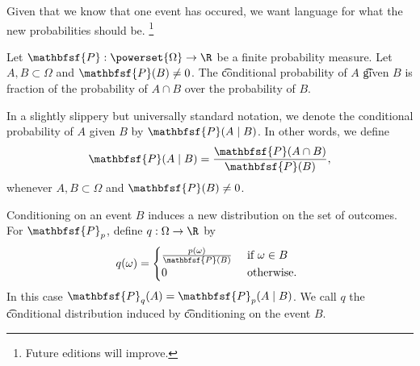 

Given that we know that one event has occured, we want language for what the new probabilities should be.
  \ifhmode\unskip\fi\footnote{
Future editions will improve.
  }

Let $\mathbfsf{P} : \powerset{\Omega } \to \R $ be a finite probability measure.
Let $A, B \subset \Omega $ and $\mathbfsf{P} (B) \neq 0$.
The \t{conditional probability} of $A$ \t{given} $B$ is fraction of the probability of $A \cap B$ over the probability of $B$.

In a slightly slippery but universally standard notation, we denote the conditional probability of $A$ given $B$ by $\mathbfsf{P} (A \mid B)$.
In other words, we define
  \[
\mathbfsf{P} (A \mid B) = \frac{\mathbfsf{P} (A \cap B)}{\mathbfsf{P} (B)},
  \]
whenever $A, B \subset \Omega $ and $\mathbfsf{P} (B) \neq 0$.

Conditioning on an event $B$ induces a new distribution on the set of outcomes.
For $\mathbfsf{P} _p$, define $q: \Omega  \to \R $ by
  \[
q(\omega ) = \begin{cases}
\frac{p(\omega )}{\mathbfsf{P} (B)} & \text{ if } \omega  \in B \\
0 & \text{ otherwise. } \\
\end{cases}
  \]
In this case $\mathbfsf{P} _q(A) = \mathbfsf{P} _p(A \mid B)$.
We call $q$ the \t{conditional distribution} induced by \t{conditioning on} the event $B$.

\blankpage

